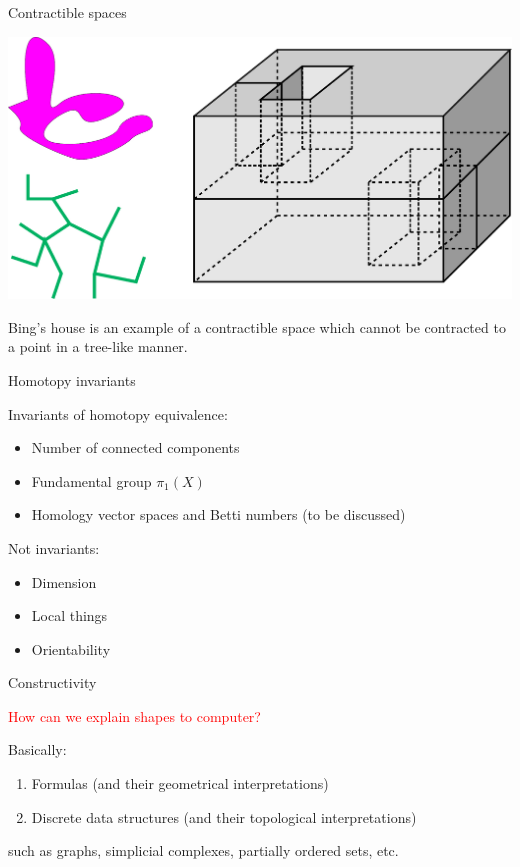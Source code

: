 \documentclass[10pt]{beamer}
\begin{document}
\begin{frame}{Contractible spaces}

\begin{center}
\includegraphics[scale = 0.3]{pictures/contractible.pdf}
\end{center}

Bing's house is an example of a contractible space which cannot be contracted to a point in a tree-like manner. 

\end{frame}



\begin{frame}{Homotopy invariants}

Invariants of homotopy equivalence:

\begin{itemize}
  \item Number of connected components \pause
  \item Fundamental group $\pi_1(X)$  \pause
  \item Homology vector spaces and Betti numbers (to be discussed)\pause
\end{itemize}

Not invariants:

\begin{itemize}
  \item Dimension \pause
  \item Local things \pause
  \item Orientability 
\end{itemize}

\end{frame}

\begin{frame}{Constructivity}

\begin{center}
\textcolor{red}{How can we explain shapes to computer?} \pause
\end{center}

Basically:
\begin{enumerate}
  \item Formulas (and their geometrical interpretations)
  \item Discrete data structures (and their topological interpretations)
\end{enumerate}

such as graphs, simplicial complexes, partially ordered sets, etc.


\end{frame}
\end{document}
